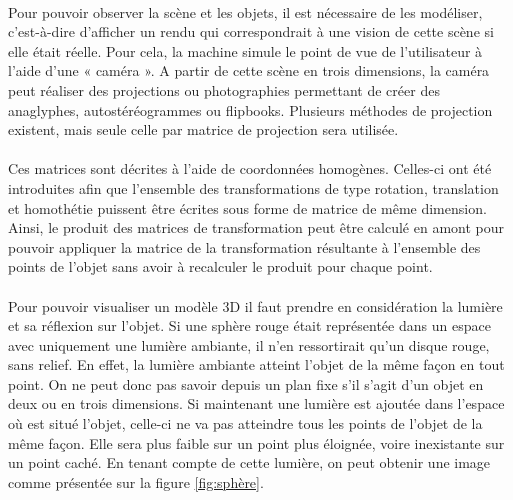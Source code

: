 \paragraph{}
	Pour pouvoir observer la scène et les objets, il est nécessaire de les modéliser, c'est-à-dire d'afficher un rendu qui correspondrait à une vision de cette scène si elle était réelle. Pour cela, la machine simule le point de vue de l'utilisateur à l'aide d'une « caméra ». A partir de cette scène en trois dimensions, la caméra peut réaliser des projections ou photographies permettant de créer des anaglyphes, autostéréogrammes ou flipbooks. Plusieurs méthodes de projection existent, mais seule celle par matrice de projection sera utilisée.

\paragraph{}
	Ces matrices sont décrites à l’aide de coordonnées homogènes. Celles-ci ont été introduites afin que l’ensemble des transformations de type rotation, translation et homothétie puissent être écrites sous forme de matrice de même dimension. Ainsi, le produit des matrices de transformation peut être calculé en amont pour pouvoir appliquer la matrice de la transformation résultante à l’ensemble des points de l’objet sans avoir à recalculer le produit pour chaque point.

\paragraph{}
	Pour pouvoir visualiser un modèle 3D il faut prendre en considération la lumière et sa réflexion sur l’objet. Si une sphère rouge était représentée dans un espace avec uniquement une lumière ambiante, il n’en ressortirait qu’un disque rouge, sans relief. En effet, la lumière ambiante atteint l’objet de la même façon en tout point. On ne peut donc pas savoir depuis un plan fixe s’il s’agit d’un objet en deux ou en trois dimensions. Si maintenant une lumière est ajoutée dans l’espace où est situé l’objet, celle-ci ne va pas atteindre tous les points de l’objet de la même façon. Elle sera plus faible sur un point plus éloignée, voire inexistante sur un point caché. En tenant compte de cette lumière, on peut obtenir une image comme présentée sur la figure \ref{fig:sphère}.

